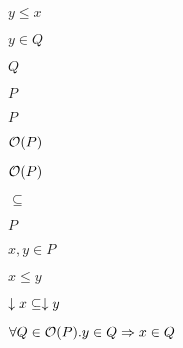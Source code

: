 \documentclass[10pt]{book}
\begin{document}
\begin{mdSnippets}
\begin{mdInlineSnippet}%
$y \leq x$\end{mdInlineSnippet}%
\begin{mdInlineSnippet}[3dc940b6300cd062df7d07398ebafe6d]%
$y \in Q$\end{mdInlineSnippet}%
\begin{mdInlineSnippet}[f09564c9ca56850d4cd6b3319e541aee]%
$Q$\end{mdInlineSnippet}%
\begin{mdInlineSnippet}%
$P$\end{mdInlineSnippet}%
\begin{mdInlineSnippet}%
$P$\end{mdInlineSnippet}%
\begin{mdInlineSnippet}[317993e5e2bf04f9fc8a6e46e423c45d]%
$\mathcal{O}(P)$\end{mdInlineSnippet}%
\begin{mdInlineSnippet}[317993e5e2bf04f9fc8a6e46e423c45d]%
$\mathcal{O}(P)$\end{mdInlineSnippet}%
\begin{mdInlineSnippet}%
$\subseteq$\end{mdInlineSnippet}%
\begin{mdInlineSnippet}%
$P$\end{mdInlineSnippet}%
\begin{mdInlineSnippet}[2b953ff9b4be6e5337e534c06e2461e7]%
$x, y \in P$\end{mdInlineSnippet}%
\begin{mdInlineSnippet}[a06b941ca6029ffd3ef8c0653b7e280e]%
$x \leq y$\end{mdInlineSnippet}%
\begin{mdInlineSnippet}[bac0560cf68bc6e3195d08dc6ae6ab05]%
$\downarrow x \subseteq \downarrow y$\end{mdInlineSnippet}%
\begin{mdInlineSnippet}[59709cddd2f980405599170b99e64c09]%
$\forall Q \in \mathcal{O}(P). y \in Q \Rightarrow x \in Q$\end{mdInlineSnippet}%

\end{mdSnippets}
\end{document}
